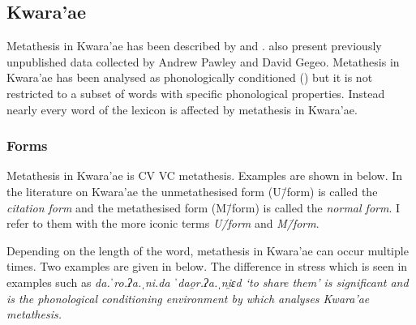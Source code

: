 \subsection{Kwara'ae}\label{sec:Kwa}
Metathesis in Kwara'ae has been described by
\citet{so80} and \citet{he04,he05}.
\citet{blga98} also present previously unpublished data
collected by Andrew Pawley and David Gegeo.
Metathesis in Kwara'ae has been analysed as phonologically conditioned ()
but it is not restricted to a subset of words with specific phonological properties.
Instead nearly every word of the lexicon is affected by metathesis in Kwara'ae.

\subsubsection{Forms}
Metathesis in Kwara'ae is CV {\ra} VC metathesis.
Examples are shown in  below.
In the literature on Kwara'ae the unmetathesised
form (U\=/form) is called the \emph{citation form} and the metathesised form
(M\=/form) is called the \emph{normal form}.
I refer to them with the more iconic terms \emph{U\=/form} and \emph{M\=/form}.

\begin{exe}
	\label{ex:KwVCV->VVC}
\end{exe}

Depending on the length of the word,
metathesis in Kwara'ae can occur multiple times.
Two examples are given in  below.
The difference in stress which is seen in examples such as
\it{da.ˈro.ʔa.ˌni.da} {\ra} \it{ˈdao̯r.ʔa.ˌni̯ɛd} `to share them'
is significant and is the phonological conditioning environment
by which \cite{he04} analyses Kwara'ae metathesis.

\begin{exe}
	\label{ex:MulMetKwa}
\end{exe}

